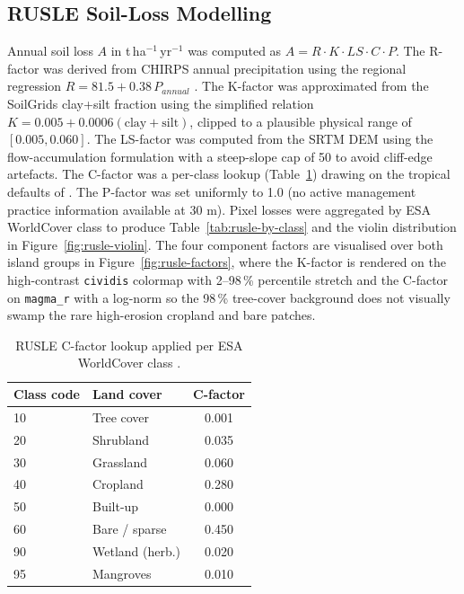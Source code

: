 \documentclass[12pt,a4paper]{article}
\begin{document}
\subsection{RUSLE Soil-Loss Modelling}
\label{sec:methods-rusle}

Annual soil loss $A$ in t\,ha$^{-1}$\,yr$^{-1}$ was computed as
$A = R\cdot K\cdot LS\cdot C\cdot P$. The R-factor was derived from
CHIRPS annual precipitation using the regional regression $R = 81.5 +
0.38\,P_{annual}$ \citep{panagos2015}. The K-factor was approximated
from the SoilGrids clay+silt fraction using the simplified relation
$K = 0.005 + 0.0006(\text{clay}+\text{silt})$, clipped to a plausible
physical range of $[0.005, 0.060]$. The LS-factor was computed from
the SRTM DEM using the \citet{moore1992} flow-accumulation
formulation with a steep-slope cap of 50 to avoid cliff-edge
artefacts. The C-factor was a per-class lookup
(Table~\ref{tab:cfactor}) drawing on the tropical defaults of
\citet{borrelli2020}. The P-factor was set uniformly to 1.0 (no
active management practice information available at 30 m). Pixel
losses were aggregated by ESA WorldCover class to produce
Table~\ref{tab:rusle-by-class} and the violin distribution in
Figure~\ref{fig:rusle-violin}. The four component factors are
visualised over both island groups in
Figure~\ref{fig:rusle-factors}, where the K-factor is rendered on the
high-contrast \texttt{cividis} colormap with 2--98\,\% percentile
stretch and the C-factor on \texttt{magma\_r} with a log-norm so the
98\,\% tree-cover background does not visually swamp the rare
high-erosion cropland and bare patches.

\begin{table}[H]
\centering
\caption{RUSLE C-factor lookup applied per ESA WorldCover class
\citep{borrelli2020,wischmeier1978}.}
\label{tab:cfactor}
\small
\begin{tabular}{l l c}
\toprule
\rowcolor{forestgreen!15}
\textbf{Class code} & \textbf{Land cover} & \textbf{C-factor} \\
\midrule
10 & Tree cover     & 0.001 \\
20 & Shrubland      & 0.035 \\
30 & Grassland      & 0.060 \\
40 & Cropland       & 0.280 \\
50 & Built-up       & 0.000 \\
60 & Bare / sparse  & 0.450 \\
90 & Wetland (herb.)& 0.020 \\
95 & Mangroves      & 0.010 \\
\bottomrule
\end{tabular}
\end{table}
\end{document}

